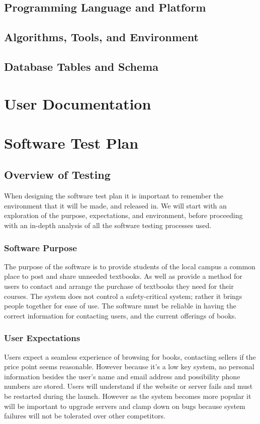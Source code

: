 \documentclass[11pt]{article}
\begin{document}
\subsection{Programming Language and Platform}

\subsection{Algorithms, Tools, and Environment}

\subsection{Database Tables and Schema}

\section{User Documentation}

\section{Software Test Plan}
	\subsection{Overview of Testing}
		When designing the software test plan it is important to remember the environment that it will be made, and released in.
		We will start with an exploration of the purpose, expectations, and environment, before proceeding with an in-depth analysis of all the software testing processes used.
		\subsubsection{Software Purpose}
			The purpose of the software is to provide students of the local campus a common place to post and share unneeded textbooks.
			As well as provide a method for users to contact and arrange the purchase of textbooks they need for their courses. 
			The system does not control a safety-critical system; rather it brings people together for ease of use. 
			The software must be reliable in having the correct information for contacting users, and the current offerings of books.
		\subsubsection{User Expectations}
			Users expect a seamless experience of browsing for books, contacting sellers if the price point seems reasonable.
			However because it's a low key system, no personal information besides the user's name and email address and possibility phone numbers are stored.
			Users will understand if the website or server fails and must be restarted during the launch.
			However as the system becomes more popular it will be important to upgrade servers and clamp down on bugs because system failures will not be tolerated over other competitors.
\end{document}
